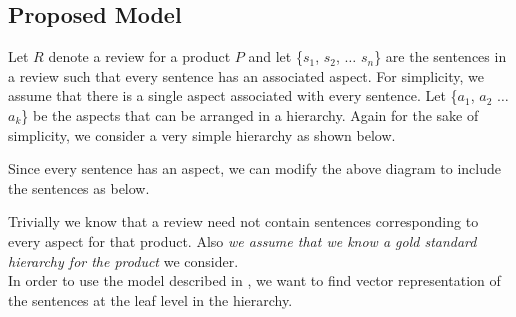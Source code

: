 \documentclass{article}
\begin{document}
\subsection{Proposed Model}
Let $R$ denote a review for a product $P$ and let \{$s_{1}$, $s_{2}$, $\dots$ $s_{n}$\} are the sentences in a review such that every sentence has an associated aspect. For simplicity, we assume that there is a single aspect associated with every sentence. Let \{$a_{1}$, $a_{2}$ $\dots$ $a_{k}$\} be the aspects that can be arranged in a hierarchy. Again for the sake of simplicity, we consider a very simple hierarchy as shown below. 
\begin{center}
\end{center}
Since every sentence has an aspect, we can modify the above diagram to include the sentences as below. 
\begin{center}
\end{center}
Trivially we know that a review need not contain sentences corresponding to every aspect for that product. Also \emph {we assume that we know a gold standard hierarchy for the product} we consider. \\
In order to use the model described in \cite{Socher}, we want to find vector representation of the sentences at the leaf level in the hierarchy. 
\end{document}
